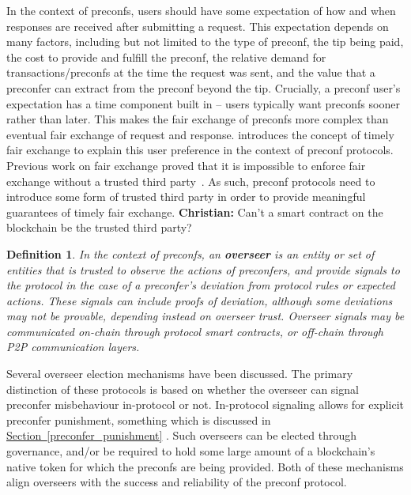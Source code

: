 \documentclass[a4paper]{article}
\theoremstyle{boldstyle}
\newtheorem{definitionx}{Definition}
\newenvironment{definition}
  {\begin{defopenboxq}\begin{definitionx}}
  {\end{definitionx}\end{defopenboxq}}
\newcommand{\chm}[1]{\textcolor{OliveGreen}{\textbf{Christian:} #1}}
\newcommand{\todoks}[1]{\todo[color=purple!40]{\textbf{Katerina:} #1}}
\begin{document}
    In the context of preconfs, users should have some expectation of how and when responses are received after submitting a request. This expectation depends on many factors, including but not limited to the type of preconf, the tip being paid, the cost to provide and fulfill the preconf, the relative demand for transactions/preconfs at the time the request was sent, and the value that a preconfer can extract from the preconf beyond the tip. Crucially, a preconf user's expectation has a time component built in -- users typically want preconfs sooner rather than later. This makes the fair exchange of preconfs more complex than eventual fair exchange of request and response. \cite{W:PreconfirmationFairExchange} introduces the concept of timely fair exchange to explain this user preference in the context of preconf protocols. Previous work on fair exchange proved that it is impossible to enforce fair exchange without a trusted third party~\cite{P:OntheImpossibilityofFairExchangewithoutaTrustedThirdParty}. As such, preconf protocols need to introduce some form of trusted third party in order to provide meaningful guarantees of timely fair exchange. \chm{Can't a smart contract on the blockchain be the trusted third party?}
    
    \begin{definition}
    \label{def:overseer}
    In the context of preconfs, an \textbf{overseer} is an entity or set of entities that is trusted to observe the actions of preconfers, and provide signals to the protocol in the case of a preconfer's deviation from protocol rules or expected actions. These signals can include proofs of deviation, although some deviations may not be provable, depending instead on overseer trust. Overseer signals may be communicated on-chain through protocol smart contracts, or off-chain through P2P communication layers.
    \end{definition}

    Several overseer election mechanisms have been discussed. The primary distinction of these protocols is based on whether the overseer can signal preconfer misbehaviour in-protocol or not. In-protocol signaling allows for explicit preconfer punishment, something which is discussed in \hyperref[preconfer_punishment]{Section~\ref{preconfer_punishment}} \todoks{internal ref}.
    Such overseers can be elected through governance, and/or be required to hold some large amount of a blockchain's native token for which the preconfs are being provided. Both of these mechanisms align overseers with the success and reliability of the preconf protocol. 
    
\end{document}
